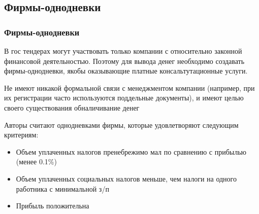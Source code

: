 \subsection{Фирмы-однодневки}

\begin{frame}

\frametitle{Фирмы-однодневки}
В гос тендерах могут участвовать только компании с относительно законной финансовой деятельностью. Поэтому для вывода денег необходимо создавать фирмы-однодневки, якобы оказывающие платные консальтутационные услуги.
\vspace{3mm}

Не имеют никакой формальной связи с менеджментом компании (например, при их регистрации часто используются поддельные документы), и имеют целью своего существования обналичивание денег
\vspace{3mm}
\end{frame}

\begin{frame}
Авторы считают однодневками фирмы, которые удовлетворяют следующим критериям:
\begin{itemize}
\item Объем уплаченных налогов пренебрежимо мал по сравнению с прибылью (менее 0.1\%)
\item Объем уплаченных социальных налогов меньше, чем налоги на одного работника с минимальной з/п
\item Прибыль положительна
\end{itemize}

\end{frame}